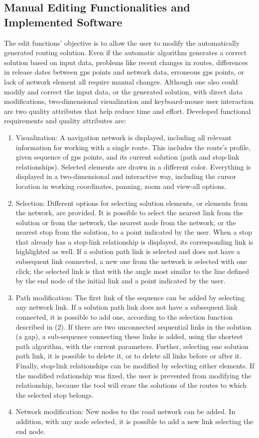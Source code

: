 \subsection{Manual Editing Functionalities and Implemented Software}
The edit functions' objective is to allow the user to modify the automatically generated routing solution. Even if the automatic algorithm generates a correct solution based on input data, problems like recent changes in routes, differences in release dates between \gls{gps} points and network data, erroneous \gls{gps} points, or lack of network element all require manual changes. Although one also could modify and correct the input data, or the generated solution, with direct data modifications, two-dimensional visualization and keyboard-mouse user interaction are two quality attributes that help reduce time and effort. Developed functional requirements and quality attributes are:
%
\begin{enumerate}\styleEnumerate
\item Visualization: A navigation network is displayed, including all relevant information for working with a single route. This includes the route's profile, given sequence of \gls{gps} points, and its current solution (path and stop-link relationships). Selected elements are drawn in a different color. Everything is displayed in a two-dimensional and interactive way, including the cursor location in working coordinates, panning, zoom and view-all options.
%
\item Selection: Different options for selecting solution elements, or elements from the network, are provided. It is possible to select the nearest link from the solution or from the network, the nearest node from the network, or the nearest stop from the solution, to a point indicated by the user. When a stop that already has a stop-link relationship is displayed, its corresponding link is highlighted as well. If a solution path link is selected and does not have a subsequent link connected, a new one from the network is selected with one click; the selected link is that with the angle most similar to the line defined by the end node of the initial link and a point indicated by the user.
%
\item Path modification: The first link of the sequence can be added by selecting any network link. If a solution path link does not have a subsequent link connected, it is possible to add one, according to the selection function described in (2). If there are two unconnected sequential links in the solution (a gap), a sub-sequence  connecting these links is added, using the shortest path algorithm, with the current parameters. Further, selecting one  solution path link, it is possible to delete it, or to delete all links before or after it. Finally, stop-link relationships can be modified by selecting either elements. If the modified relationship was fixed, the user is prevented from modifying the relationship, because the tool will erase the solutions of the routes to which the selected stop belongs.
%
\item Network modification: New nodes to the road network can be added. In addition, with any node selected, it is possible to add a new link selecting the end node.
\end{enumerate}

